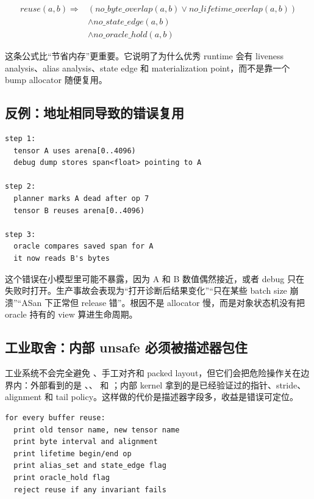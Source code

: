 \[
\begin{aligned}
reuse(a,b) \Rightarrow{}&
  (no\_byte\_overlap(a,b) \lor no\_lifetime\_overlap(a,b))\\
& \land no\_state\_edge(a,b)\\
& \land no\_oracle\_hold(a,b)
\end{aligned}
\]

这条公式比“节省内存”更重要。它说明了为什么优秀 runtime 会有 liveness analysis、alias analysis、state edge 和 materialization point，而不是靠一个 bump allocator 随便复用。

\subsection{反例：地址相同导致的错误复用}

\begin{lstlisting}[numbers=none,caption={同一地址、不同对象身份的错误复用}]
step 1:
  tensor A uses arena[0..4096)
  debug dump stores span<float> pointing to A

step 2:
  planner marks A dead after op 7
  tensor B reuses arena[0..4096)

step 3:
  oracle compares saved span for A
  it now reads B's bytes
\end{lstlisting}

这个错误在小模型里可能不暴露，因为 A 和 B 数值偶然接近，或者 debug 只在失败时打开。生产事故会表现为“打开诊断后结果变化”“只在某些 batch size 崩溃”“ASan 下正常但 release 错”。根因不是 allocator 慢，而是对象状态机没有把 oracle 持有的 view 算进生命周期。

\subsection{工业取舍：内部 unsafe 必须被描述器包住}

工业系统不会完全避免 、手工对齐和 packed layout，但它们会把危险操作关在边界内：外部看到的是 、、 和 ；内部 kernel 拿到的是已经验证过的指针、stride、alignment 和 tail policy。这样做的代价是描述器字段多，收益是错误可定位。

\begin{lstlisting}[numbers=none,caption={对象状态机实验的检查项}]
for every buffer reuse:
  print old tensor name, new tensor name
  print byte interval and alignment
  print lifetime begin/end op
  print alias_set and state_edge flag
  print oracle_hold flag
  reject reuse if any invariant fails
\end{lstlisting}

